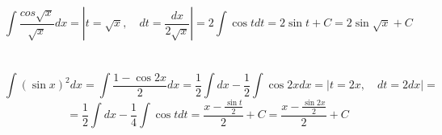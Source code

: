 \section{}
    \[\int \frac{cos{\sqrt{x}}}{\sqrt{x}}dx = \left|t = \sqrt{x}, \quad
    dt = \frac{dx}{2 \sqrt{x}} \right| = 2 \int \cos{t}dt = 
    2 \sin{t} + C = 2 \sin{\sqrt{x}} + C\]

\section{}    
    \[\int (\sin{x})^2 dx = \int \frac{1 - \cos{2x}}{2}dx = \frac{1}{2} \int dx
    - \frac{1}{2} \int \cos{2x}dx = \left|t = 2x, \quad
    dt = 2dx \right| = \] 
    \[= \frac{1}{2} \int dx - \frac{1}{4} \int \cos{t}dt =
    \frac{x - \frac{\sin{t}}{2}}{2} + C = \frac{x - \frac{\sin{2x}}{2}}{2} + C\]

\section{}    